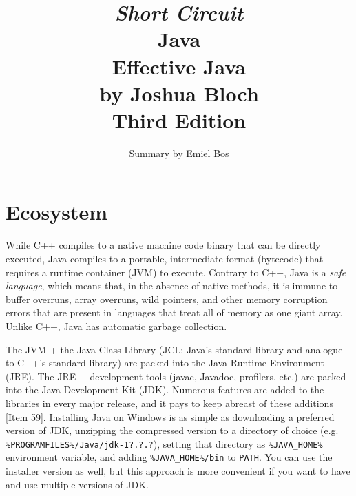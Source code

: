 \documentclass[8pt, table, xcdraw]{article}%
\title{
\textit{Short Circuit}\\
\vspace{15px}
\huge
Java\\
\vspace{20px}
\large
Effective Java\\
by Joshua Bloch\\
Third Edition
}
\author{Summary by Emiel Bos}
\date{}
\begin{document}
\maketitle

\section{Ecosystem}

While C++ compiles to a native machine code binary that can be directly executed, Java compiles to a portable, intermediate format (bytecode) that requires a runtime container (JVM) to execute. Contrary to C++, Java is a \emph{safe language}, which means that, in the absence of native methods, it is immune to buffer overruns, array overruns, wild pointers, and other memory corruption errors that are present in languages that treat all of memory as one giant array. Unlike C++, Java has automatic garbage collection.

The JVM + the Java Class Library (JCL; Java's standard library and analogue to C++'s standard library) are packed into the Java Runtime Environment (JRE). The JRE + development tools (javac, Javadoc, profilers, etc.) are packed into the Java Development Kit (JDK). Numerous features are added to the libraries in every major release, and it pays to keep abreast of these additions [Item 59]. Installing Java on Windows is as simple as downloading a \href{https://www.oracle.com/java/technologies/downloads/archive}{preferred version of JDK}, unzipping the compressed version to a directory of choice (e.g. \lstinline{%PROGRAMFILES%/Java/jdk-1?.?.?}), setting that directory as \lstinline{%JAVA_HOME%} environment variable, and adding \lstinline{%JAVA_HOME%/bin} to \lstinline{PATH}. You can use the installer version as well, but this approach is more convenient if you want to have and use multiple versions of JDK.
\end{document}
